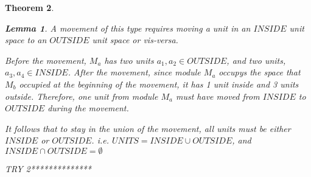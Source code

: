 \documentclass[12pt]{article}
\newtheorem{theorem}{Theorem}[section]
\newtheorem{lemma}[theorem]{Lemma}
\newenvironment{proof}[1][Proof]{\begin{trivlist}
\item[\hskip \labelsep {\bfseries #1}]}{\end{trivlist}}
\begin{document}
\begin{theorem}
\begin{lemma} A movement of this type requires moving a unit in an $INSIDE$ unit space to an $OUTSIDE$ unit space or vis-versa.
  \begin{proof} 
    Before the movement, $M_a$ has two units $a_1, a_2 \in OUTSIDE$, 
    and two units, $a_3, a_4 \in INSIDE$. After the movement, since 
    module $M_a$ occupys the space that $M_b$ occupied at the 
    beginning of the movement, it has 1 unit inside and 3 units 
    outside. Therefore, one unit from module $M_a$ must have moved 
    from $INSIDE$ to $OUTSIDE$ during the movement. 
  \end{proof}
\end{lemma}
It follows that to stay in the union of the movement, all units must be either $INSIDE$ or $OUTSIDE$. i.e. $UNITS = INSIDE \cup OUTSIDE$, and $INSIDE \cap OUTSIDE = \emptyset$

TRY 2**************


\end{theorem}
\end{document}
